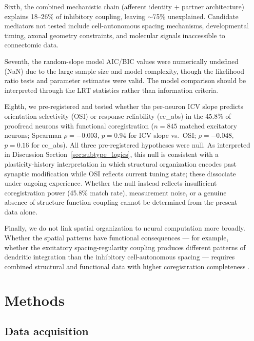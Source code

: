 \documentclass[11pt]{article}
\begin{document}
Sixth, the combined mechanistic chain (afferent identity $+$ partner architecture) explains 18--26\% of inhibitory coupling, leaving $\sim$75\% unexplained. Candidate mediators not tested include cell-autonomous spacing mechanisms, developmental timing, axonal geometry constraints, and molecular signals inaccessible to connectomic data.

Seventh, the random-slope model AIC/BIC values were numerically undefined (NaN) due to the large sample size and model complexity, though the likelihood ratio tests and parameter estimates were valid. The model comparison should be interpreted through the LRT statistics rather than information criteria.

Eighth, we pre-registered and tested whether the per-neuron ICV slope predicts orientation selectivity (OSI) or response reliability (cc\_abs) in the 45.8\% of proofread neurons with functional coregistration ($n = 845$ matched excitatory neurons; Spearman $\rho = -0.003$, $p = 0.94$ for ICV slope vs.\ OSI; $\rho = -0.048$, $p = 0.16$ for cc\_abs). All three pre-registered hypotheses were null. As interpreted in Discussion Section~\ref{sec:subtype_logics}, this null is consistent with a plasticity-history interpretation in which structural organization encodes past synaptic modification while OSI reflects current tuning state; these dissociate under ongoing experience. Whether the null instead reflects insufficient coregistration power (45.8\% match rate), measurement noise, or a genuine absence of structure-function coupling cannot be determined from the present data alone.

Finally, we do not link spatial organization to neural computation more broadly. Whether the spatial patterns have functional consequences --- for example, whether the excitatory spacing-regularity coupling produces different patterns of dendritic integration than the inhibitory cell-autonomous spacing --- requires combined structural and functional data with higher coregistration completeness \citep{jia2010}.


\section{Methods}

\subsection{Data acquisition}
\end{document}
